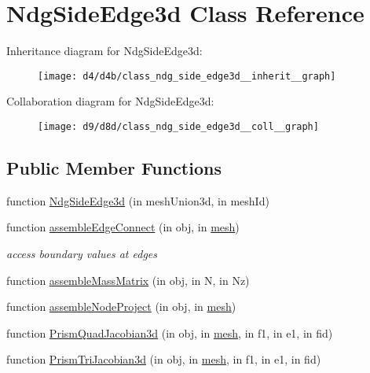 \hypertarget{class_ndg_side_edge3d}{}\section{Ndg\+Side\+Edge3d Class Reference}
\label{class_ndg_side_edge3d}


Inheritance diagram for Ndg\+Side\+Edge3d\+:
\nopagebreak
\begin{figure}[H]
\begin{center}
\leavevmode
\texttt{[image: d4/d4b/class\_ndg\_side\_edge3d\_\_inherit\_\_graph]}
\end{center}
\end{figure}


Collaboration diagram for Ndg\+Side\+Edge3d\+:
\nopagebreak
\begin{figure}[H]
\begin{center}
\leavevmode
\texttt{[image: d9/d8d/class\_ndg\_side\_edge3d\_\_coll\_\_graph]}
\end{center}
\end{figure}
\subsection*{Public Member Functions}
\begin{DoxyCompactItemize}
\item 
function \hyperlink{class_ndg_side_edge3d_a2691f21d80e4edea985bc0639c0b4f44}{Ndg\+Side\+Edge3d} (in mesh\+Union3d, in mesh\+Id)
\item 
function \hyperlink{class_ndg_side_edge3d_ac5b112d540f4bf582244a3fa1be378c6}{assemble\+Edge\+Connect} (in obj, in \hyperlink{class_ndg_side_edge3d_a60de04f2f3079b24be4de0e1cab6e116}{mesh})
\begin{DoxyCompactList}\small\item\em access boundary values at edges \end{DoxyCompactList}\item 
function \hyperlink{class_ndg_side_edge3d_a420b6af0727f2eb956efe11ad85ff52a}{assemble\+Mass\+Matrix} (in obj, in N, in Nz)
\item 
function \hyperlink{class_ndg_side_edge3d_a2b9cc61ae2354a4133e1570c6a819365}{assemble\+Node\+Project} (in obj, in \hyperlink{class_ndg_side_edge3d_a60de04f2f3079b24be4de0e1cab6e116}{mesh})
\item 
function \hyperlink{class_ndg_side_edge3d_a525e511d989b4de08a34a29637b3290a}{Prism\+Quad\+Jacobian3d} (in obj, in \hyperlink{class_ndg_side_edge3d_a60de04f2f3079b24be4de0e1cab6e116}{mesh}, in f1, in e1, in fid)
\item 
function \hyperlink{class_ndg_side_edge3d_a3a20f8d85c43be393f50781a6bce229d}{Prism\+Tri\+Jacobian3d} (in obj, in \hyperlink{class_ndg_side_edge3d_a60de04f2f3079b24be4de0e1cab6e116}{mesh}, in f1, in e1, in fid)
\end{DoxyCompactItemize}
